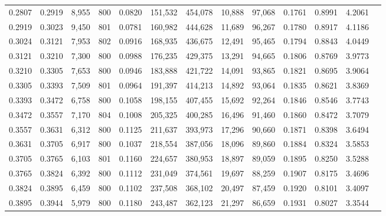 \begin{tabular}{rrrrrrrrrrrrr}
0.2807 & 0.2919 &  8,955 & 800 &                                     0.0820 & 151,532 & 454,078 &  10,888 &  97,068 & 0.1761 & 0.8991 & 4.2061 \\
0.2919 & 0.3023 &  9,450 & 801 &                                     0.0781 & 160,982 & 444,628 &  11,689 &  96,267 & 0.1780 & 0.8917 & 4.1186 \\
0.3024 & 0.3121 &  7,953 & 802 &                                     0.0916 & 168,935 & 436,675 &  12,491 &  95,465 & 0.1794 & 0.8843 & 4.0449 \\
0.3121 & 0.3210 &  7,300 & 800 &                                     0.0988 & 176,235 & 429,375 &  13,291 &  94,665 & 0.1806 & 0.8769 & 3.9773 \\
0.3210 & 0.3305 &  7,653 & 800 &                                     0.0946 & 183,888 & 421,722 &  14,091 &  93,865 & 0.1821 & 0.8695 & 3.9064 \\
0.3305 & 0.3393 &  7,509 & 801 &                                     0.0964 & 191,397 & 414,213 &  14,892 &  93,064 & 0.1835 & 0.8621 & 3.8369 \\
0.3393 & 0.3472 &  6,758 & 800 &                                     0.1058 & 198,155 & 407,455 &  15,692 &  92,264 & 0.1846 & 0.8546 & 3.7743 \\
0.3472 & 0.3557 &  7,170 & 804 &                                     0.1008 & 205,325 & 400,285 &  16,496 &  91,460 & 0.1860 & 0.8472 & 3.7079 \\
0.3557 & 0.3631 &  6,312 & 800 &                                     0.1125 & 211,637 & 393,973 &  17,296 &  90,660 & 0.1871 & 0.8398 & 3.6494 \\
0.3631 & 0.3705 &  6,917 & 800 &                                     0.1037 & 218,554 & 387,056 &  18,096 &  89,860 & 0.1884 & 0.8324 & 3.5853 \\
0.3705 & 0.3765 &  6,103 & 801 &                                     0.1160 & 224,657 & 380,953 &  18,897 &  89,059 & 0.1895 & 0.8250 & 3.5288 \\
0.3765 & 0.3824 &  6,392 & 800 &                                     0.1112 & 231,049 & 374,561 &  19,697 &  88,259 & 0.1907 & 0.8175 & 3.4696 \\
0.3824 & 0.3895 &  6,459 & 800 &                                     0.1102 & 237,508 & 368,102 &  20,497 &  87,459 & 0.1920 & 0.8101 & 3.4097 \\
0.3895 & 0.3944 &  5,979 & 800 &                                     0.1180 & 243,487 & 362,123 &  21,297 &  86,659 & 0.1931 & 0.8027 & 3.3544 \\

\end{tabular}
